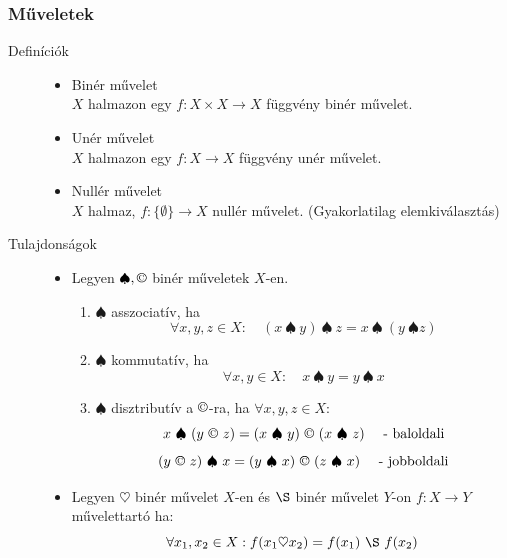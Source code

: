 \documentclass[margin=0px]{article}
\begin{document}
			\subsubsection{Műveletek}
				\begin{description}
					\item[Definíciók] \hfill
						\begin{itemize}
							\item Binér művelet \\
								$X$ halmazon egy $f : X \times X \rightarrow X$ függvény binér művelet.
							\item Unér művelet \\
								$X$ halmazon egy $f : X \rightarrow X$ függvény unér művelet.
							\item Nullér művelet \\
								$X$ halmaz, $f : \{\emptyset \} \rightarrow X $ nullér művelet. (Gyakorlatilag elemkiválasztás)
						\end{itemize}
					\item[Tulajdonságok] \hfill
						\begin{itemize}
							\item Legyen $\spadesuit, \copyright$ binér műveletek $X$-en. 
								\begin{enumerate}
									\item $\spadesuit$ asszociatív, ha
									\[ \forall x,y,z \in X : \quad (x \ \spadesuit \ y ) \ \spadesuit \ z = x \  \spadesuit \  (y \ \spadesuit z) \]
									
									\item $\spadesuit$ kommutatív, ha
									\[ \forall x,y \in X : \quad x \ \spadesuit \ y = y \  \spadesuit \  x \]
									
									\item $\spadesuit$ disztributív a $\copyright$-ra, ha $\forall x,y,z \in X$:
									\[ x \  \spadesuit \  (y \ \copyright \ z) = (x \  \spadesuit \ y) \ \copyright \ (x \ \spadesuit \ z) \quad \textrm{ - baloldali} \]
									\[ (y \ \copyright \ z) \  \spadesuit \ x = (y \  \spadesuit \ x) \ \copyright \ (z \ \spadesuit \ x) \quad \textrm{ - jobboldali} \]
								\end{enumerate}
								
							\item Legyen $\heartsuit$ binér művelet $X$-en és $\S$ binér művelet $Y$-on
							$f : X \rightarrow Y$ művelettartó ha:
							\[ \forall x_1,x_2 \in X:  f(x_1 \heartsuit x_2) = f(x_1) \ \S \ f(x_2) \]
						\end{itemize}
				\end{description}
\end{document}
